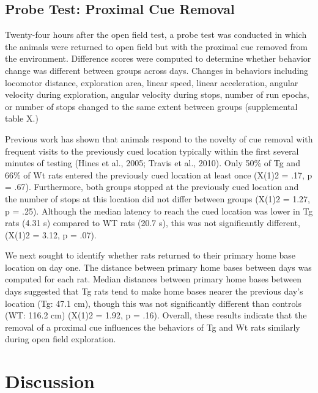 \documentclass[fleqn,10pt]{wlscirep}
\begin{document}
\subsection*{Probe Test: Proximal Cue Removal}
Twenty-four hours after the open field test, a probe test was conducted in which the animals were returned to open field but with the proximal cue removed from the environment. Difference scores were computed to determine whether behavior change was different between groups across days. Changes in behaviors including locomotor distance, exploration area, linear speed, linear acceleration, angular velocity during exploration, angular velocity during stops, number of run epochs, or number of stops changed to the same extent between groups (supplemental table X.) 

Previous work has shown that animals respond to the novelty of cue removal with frequent visits to the previously cued location typically within the first several minutes of testing (Hines et al., 2005; Travis et al., 2010). Only 50\% of Tg and 66\% of Wt rats entered the previously cued location at least once (X(1)2 = .17, p = .67). Furthermore, both groups stopped at the previously cued location and the number of stops at this location did not differ between groups (X(1)2 = 1.27, p = .25). Although the median latency to reach the cued location was lower in Tg rats (4.31 s) compared to WT rats (20.7 s), this was not significantly different, (X(1)2 = 3.12, p = .07). 

We next sought to identify whether rats returned to their primary home base location on day one. The distance between primary home bases between days was computed for each rat. Median distances between primary home bases between days suggested that Tg rats tend to make home bases nearer the previous day’s location (Tg: 47.1 cm), though this was not significantly different than controls (WT: 116.2 cm) (X(1)2 = 1.92, p = .16). 
Overall, these results indicate that the removal of a proximal cue influences the behaviors of Tg and Wt rats similarly during open field exploration. 

\section*{Discussion}
\end{document}
